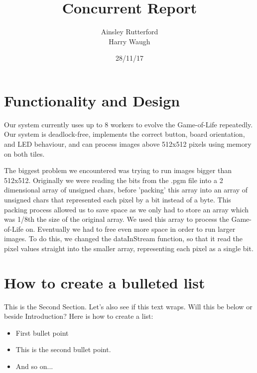 \documentclass{article}
\begin{document}
\title{\vspace{-2.0cm}Concurrent Report}

\author{Ainsley Rutterford \\ Harry Waugh}

\date{28/11/17}

\maketitle

\begin{multicols}{2}

\section{Functionality and Design}
Our system currently uses up to 8 workers to evolve the Game-of-Life repeatedly. Our system is deadlock-free, implements the correct button, board orientation, and LED behaviour, and can process images above 512x512 pixels using memory on both tiles.

The biggest problem we encountered was trying to run images bigger than 512x512. Originally we were reading the bits from the .pgm file into a 2 dimensional array of unsigned chars, before 'packing' this array into an array of unsigned chars that represented each pixel by a bit instead of a byte. This packing process allowed us to save space as we only had to store an array which was 1/8th the size of the original array. We used this array to process the Game-of-Life on. Eventually we had to free even more space in order to run larger images. To do this, we changed the dataInStream function, so that it read the pixel values straight into the smaller array, representing each pixel as a single bit. 

\section{How to create a bulleted list}
This is the Second Section. Let's also see if this text wraps. Will this be below or beside Introduction? Here is how to create a list:

\begin{itemize}
\item First bullet point
\item This is the second bullet point.
\item And so on...
\end{itemize}


\end{multicols}
\end{document}
